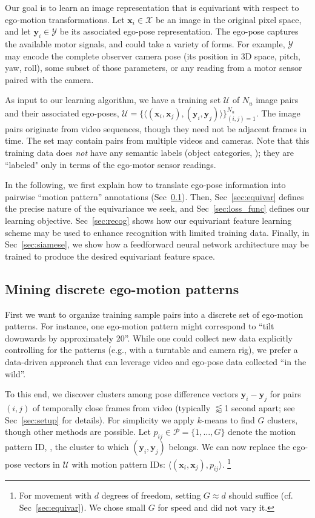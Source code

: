 \documentclass[10pt,twocolumn,letterpaper]{article}
\begin{document}
Our goal is to learn an image representation that is equivariant with respect to ego-motion transformations.
Let $\bm{x}_i \in \mathcal{X}$ be an image in the original pixel space, and let $\bm{y}_i \in \mathcal{Y}$ be its associated ego-pose representation.  The ego-pose captures the available motor signals, and could take a variety of forms.  For example, $\mathcal{Y}$ may encode the complete observer camera pose (its position in 3D space, pitch, yaw, roll), some subset of those parameters, or any reading from a motor sensor paired with the camera.

As input to our learning algorithm, we have a training set $\mathcal{U}$ of $N_u$ image pairs and their associated ego-poses, $\mathcal{U} = \{\langle (\bm{x}_i,\bm{x}_j), (\bm{y}_i, \bm{y}_j) \rangle\}_{(i,j)=1}^{N_u}$.
The image pairs originate from video sequences, though they need not be adjacent frames in time.   The set may contain pairs from multiple videos and cameras.  Note that this training data does \emph{not} have any semantic labels (object categories, \etc); they are ``labeled" only in terms of the ego-motor sensor readings.

In the following, we first explain how to translate ego-pose information into pairwise ``motion pattern'' annotations (Sec~\ref{sec:motionPatterns}).  Then, Sec~\ref{sec:equivar} defines the precise nature of the equivariance we seek, and Sec~\ref{sec:loss_func} defines our learning objective. Sec~\ref{sec:recog} shows how our equivariant feature learning scheme may be used to enhance recognition with limited training data. Finally, in Sec~\ref{sec:siamese}, we show how a feedforward neural network architecture may be trained to produce the desired equivariant feature space.

\subsection{Mining discrete ego-motion patterns}\label{sec:motionPatterns}

First we want to organize training sample pairs into a discrete set of ego-motion patterns.  For instance, one ego-motion pattern might correspond to ``tilt downwards by approximately 20\textdegree''.
While one could collect new data explicitly controlling for the patterns (e.g., with a turntable and camera rig), we prefer a data-driven approach that can leverage video and ego-pose data collected ``in the wild''.

To this end, we discover clusters among pose difference vectors $\bm{y}_i-\bm{y}_j$ for pairs $(i,j)$ of temporally close frames from video (typically $\lessapprox$1 second apart; see Sec~\ref{sec:setup} for details).  For simplicity we apply $k$-means to find $G$ clusters, though other methods are possible.  Let $p_{ij}\in\mathcal{P}=\{1,\dots,G\}$ denote the motion pattern ID, \ie, the cluster to which $(\bm{y}_i,\bm{y}_j)$ belongs.  We can now replace the ego-pose vectors in $\mathcal{U}$ with motion pattern IDs: $\langle (\bm{x}_i,\bm{x}_j), p_{ij} \rangle$.
\footnote{For movement with $d$ degrees of freedom, setting $G\approx d$ should suffice (cf. Sec~\ref{sec:equivar}). We chose small $G$ for speed and did not vary it.}%
\end{document}
